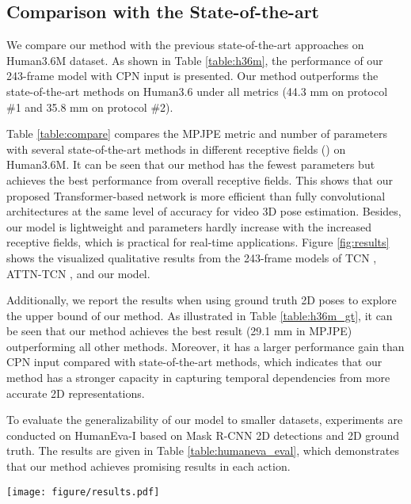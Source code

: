 \documentclass[10pt,twocolumn,letterpaper]{article}
\begin{document}
\subsection{Comparison with the State-of-the-art}
We compare our method with the previous state-of-the-art approaches on Human3.6M dataset. 
As shown in Table \ref{table:h36m}, the performance of our 243-frame model with CPN input is presented. 
Our method outperforms the state-of-the-art methods on Human3.6 under all metrics (44.3 mm on protocol \#1 and 35.8 mm on protocol \#2). 

Table \ref{table:compare} compares the MPJPE metric and number of parameters with several state-of-the-art methods in different receptive fields () on Human3.6M. 
It can be seen that our method has the fewest parameters but achieves the best performance from overall receptive fields. 
This shows that our proposed Transformer-based network is more efficient than fully convolutional architectures at the same level of accuracy for video 3D pose estimation. 
Besides, our model is lightweight and parameters hardly increase with the increased receptive fields, which is practical for real-time applications. 
Figure \ref{fig:results} shows the visualized qualitative results from the 243-frame models of TCN \cite{pavllo20193d}, ATTN-TCN \cite{liu2020attention}, and our model. 

Additionally, we report the results when using ground truth 2D poses to explore the upper bound of our method. 
As illustrated in Table \ref{table:h36m_gt}, it can be seen that our method achieves the best result (29.1 mm in MPJPE) outperforming all other methods. 
Moreover, it has a larger performance gain than CPN input compared with state-of-the-art methods, which indicates that our method has a stronger capacity in capturing temporal dependencies from more accurate 2D representations. 

To evaluate the generalizability of our model to smaller datasets, experiments are conducted on HumanEva-I based on Mask R-CNN 2D detections and 2D ground truth. 
The results are given in Table \ref{table:humaneva_eval}, which demonstrates that our method achieves promising results in each action. 

\begin{figure*}[t]
	\centering
	\texttt{[image: figure/results.pdf]}
	\caption
	{
      Qualitative comparisons with the previous state-of-the-art methods, 243-frame model of TCN \cite{pavllo20193d} and ATTN-TCN \cite{liu2020attention} on Human3.6M dataset. 
	}
	\label{fig:results}
\end{figure*}
\end{document}

